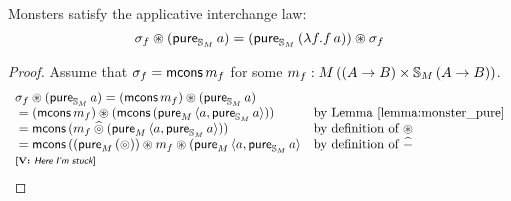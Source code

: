 \begin{lemma}
Monsters satisfy the applicative interchange law:
$$
\sigma_f \circledast (\mathsf{pure}_{\mathbb{S}_{M}}\,a) = (\mathsf{pure}_{\mathbb{S}_{M}}\,(\lambda f. f\,a)) \circledast \sigma_f
$$
\end{lemma}
\begin{proof}
Assume that $\sigma_f = \mathsf{mcons}\,m_f$ for some $m_f:M\,((A\rightarrow B)\times \mathbb{S}_{M}\,(A\rightarrow B))$.
$$
\begin{array}{ll}
\sigma_f \appl (\apure_{\stream{M}}\,a) = (\mcons\,m_f) \appl (\apure_{\stream{M}}\,a) \\
{}= (\mcons\,m_f) \appl (\mcons\,(\apure_M\,\langle a, \apure_{\stream{M}}\,a\rangle))
  & \mbox{by Lemma \ref{lemma:monster_pure}}\\
{}= \mcons\,(m_f \alift{\pappl} (\apure_M\,\langle a, \apure_{\stream{M}}\,a\rangle))
  & \mbox{by definition of }\appl\\
{}= \mcons\,((\apure_M\,(\pappl)) \appl m_f \appl (\apure_M\,\langle a, \apure_{\stream{M}}\,a\rangle
  & \mbox{by definition of }\alift{-}\\
\mbox{\vcomm{Here I'm stuck}}
\end{array}
$$
\end{proof}
